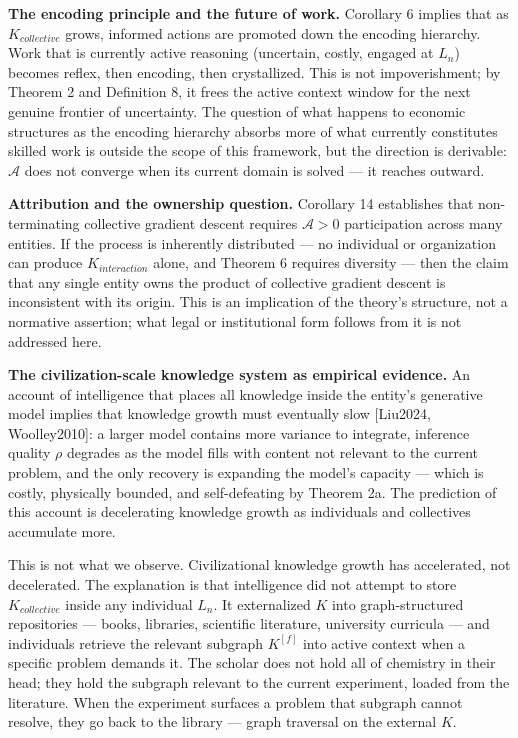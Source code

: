 \documentclass[
]{article}
\begin{document}
\textbf{The encoding principle and the future of work.} Corollary 6
implies that as \(K_{collective}\) grows, informed actions are promoted
down the encoding hierarchy. Work that is currently active reasoning
(uncertain, costly, engaged at \(L_n\)) becomes reflex, then encoding,
then crystallized. This is not impoverishment; by Theorem 2 and
Definition 8, it frees the active context window for the next genuine
frontier of uncertainty. The question of what happens to economic
structures as the encoding hierarchy absorbs more of what currently
constitutes skilled work is outside the scope of this framework, but the
direction is derivable: \(\mathcal{A}\) does not converge when its
current domain is solved --- it reaches outward.

\textbf{Attribution and the ownership question.} Corollary 14
establishes that non-terminating collective gradient descent requires
\(\mathcal{A} > 0\) participation across many entities. If the process
is inherently distributed --- no individual or organization can produce
\(K_{interaction}\) alone, and Theorem 6 requires diversity --- then the
claim that any single entity owns the product of collective gradient
descent is inconsistent with its origin. This is an implication of the
theory's structure, not a normative assertion; what legal or
institutional form follows from it is not addressed here.

\textbf{The civilization-scale knowledge system as empirical evidence.}
An account of intelligence that places all knowledge inside the entity's
generative model implies that knowledge growth must eventually slow
{[}Liu2024, Woolley2010{]}: a larger model contains more variance to
integrate, inference quality \(\rho\) degrades as the model fills with
content not relevant to the current problem, and the only recovery is
expanding the model's capacity --- which is costly, physically bounded,
and self-defeating by Theorem 2a. The prediction of this account is
decelerating knowledge growth as individuals and collectives accumulate
more.

This is not what we observe. Civilizational knowledge growth has
accelerated, not decelerated. The explanation is that intelligence did
not attempt to store \(K_{collective}\) inside any individual \(L_n\).
It externalized \(K\) into graph-structured repositories --- books,
libraries, scientific literature, university curricula --- and
individuals retrieve the relevant subgraph \(K^{[f]}\) into active
context when a specific problem demands it. The scholar does not hold
all of chemistry in their head; they hold the subgraph relevant to the
current experiment, loaded from the literature. When the experiment
surfaces a problem that subgraph cannot resolve, they go back to the
library --- graph traversal on the external \(K\).
\end{document}
